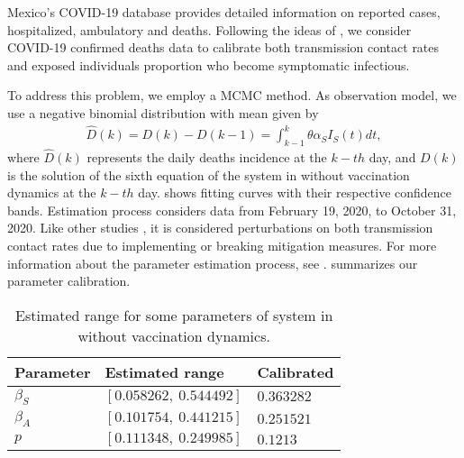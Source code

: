     Mexico’s COVID-19 database provides detailed information on reported 
cases, hospitalized,
ambulatory and deaths. Following the ideas of \az [Fergunson]\za, we consider 
COVID-19 confirmed deaths data to calibrate both transmission contact rates and exposed individuals proportion who become symptomatic infectious.

    To address this problem, we employ a MCMC method. As observation model, we use a negative
binomial distribution with mean given by
\begin{equation}\label{incidence}
    \begin{aligned}
        \widehat{D}(k) = D(k) - D(k-1)=\int_{k-1}^k \theta\alpha_{S}I_{S}(t) dt,
    \end{aligned}
\end{equation}
where $\widehat{D}(k)$ represents the daily deaths incidence at the $k-th$ day,
and $D(k)$ is the solution of the sixth equation of the system in 
without vaccination dynamics at the $k-th$ day.  shows 
fitting curves with their respective confidence bands.
Estimation process considers data from February 19, 2020, to October 31, 2020. 
Like other studies \cite{Acuna2020,Santana2020}, it is considered 
perturbations on both transmission contact rates due to implementing or 
breaking mitigation measures. 
For more information about the parameter estimation process, 
see .  
summarizes our parameter calibration.
%
\begin{table}[tbh]
    \begin{center}
        \begin{tabular}{lll}
            \toprule
            Parameter & Estimated range & Calibrated
            \\
            \midrule
            $\beta_S$ & $[\num{0.058262},\  \num{0.544492}]$ & $0.363282$ 
            \\
            $\beta_A$ & $[\num{0.101754},\ \num{0.441215}]$ & $0.251 521$ 
            \\
            $p$       & $[\num{0.111348},\ \num{0.249985}]$ & $0.1213$ 
            \\
            \bottomrule
        \end{tabular}
        \caption{%
            Estimated range for some parameters of system in 
        without vaccination dynamics.
        }\label{table_icparam}
    \end{center}
\end{table}
